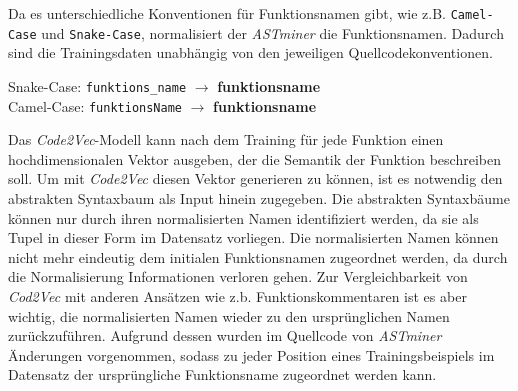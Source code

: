 \documentclass[12pt,letterpaper,ngerman]{article}
\begin{document}
Da es unterschiedliche Konventionen für Funktionsnamen gibt, wie z.B.
\verb|Camel-Case| und \verb|Snake-Case|, normalisiert der \textit{ASTminer} 
die Funktionsnamen. Dadurch sind die Trainingsdaten unabhängig von den
jeweiligen Quellcodekonventionen.
\begin{example}
  \hfill
  \begin{center}
    Snake-Case: \verb|funktions_name| $\to$ {\bf funktions\text{\textbar}name }\\
    Camel-Case: \verb|funktionsName| $\to$ {\bf funktions\text{\textbar}name}
  \end{center}
\end{example}
Das \textit{Code2Vec}-Modell kann nach dem Training für jede 
Funktion einen hochdimensionalen
Vektor ausgeben, der die Semantik der Funktion beschreiben soll.
Um mit \textit{Code2Vec} diesen Vektor generieren zu können, ist 
es notwendig den abstrakten Syntaxbaum als Input hinein zugegeben.
Die abstrakten Syntaxbäume können nur durch 
ihren normalisierten Namen identifiziert werden, da sie als Tupel 
in dieser Form im Datensatz vorliegen. Die normalisierten Namen
können nicht mehr 
eindeutig dem initialen Funktionsnamen zugeordnet werden, da durch die 
Normalisierung Informationen verloren gehen. Zur Vergleichbarkeit von 
\textit{Cod2Vec} mit anderen Ansätzen wie z.b. Funktionskommentaren ist
es aber wichtig,
die normalisierten Namen wieder zu den ursprünglichen Namen zurückzuführen.
Aufgrund dessen wurden im Quellcode von \textit{ASTminer} Änderungen
vorgenommen, sodass zu jeder Position eines Trainingsbeispiels im 
Datensatz der ursprüngliche Funktionsname zugeordnet werden kann. 
\end{document}
